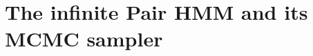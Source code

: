 \documentclass[11pt]{article}
\theoremstyle{remark}
\numberwithin{equation}{section}
\numberwithin{figure}{section}
\numberwithin{table}{section}
\begin{document}


\section{The infinite Pair HMM and its MCMC sampler}
\label{app:phmm}





\end{document}
